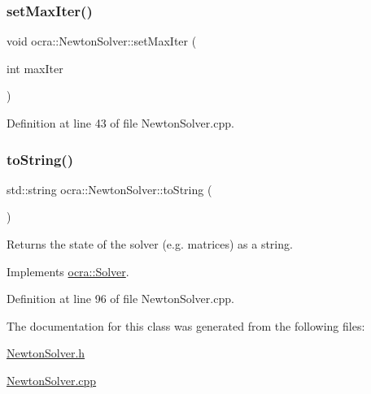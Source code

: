 \hypertarget{classocra_1_1NewtonSolver_a7bea41cafca30faf5dca35a7e3bd8a2e}{}\label{classocra_1_1NewtonSolver_a7bea41cafca30faf5dca35a7e3bd8a2e} 
\subsubsection{\texorpdfstring{set\+Max\+Iter()}{setMaxIter()}}
{\footnotesize\ttfamily void ocra\+::\+Newton\+Solver\+::set\+Max\+Iter (\begin{DoxyParamCaption}\item[{int}]{max\+Iter }\end{DoxyParamCaption})}



Definition at line 43 of file Newton\+Solver.\+cpp.

\hypertarget{classocra_1_1NewtonSolver_a3d498cc7771cf3cf733552a35fd77006}{}\label{classocra_1_1NewtonSolver_a3d498cc7771cf3cf733552a35fd77006} 
\subsubsection{\texorpdfstring{to\+String()}{toString()}}
{\footnotesize\ttfamily std\+::string ocra\+::\+Newton\+Solver\+::to\+String (\begin{DoxyParamCaption}{ }\end{DoxyParamCaption})\hspace{0.3cm}{\ttfamily [virtual]}}

Returns the state of the solver (e.\+g. matrices) as a string. 

Implements \hyperlink{classocra_1_1Solver_ab3783d1c208500bfb1daa3e1abf34146}{ocra\+::\+Solver}.



Definition at line 96 of file Newton\+Solver.\+cpp.



The documentation for this class was generated from the following files\+:\begin{DoxyCompactItemize}
\item 
\hyperlink{NewtonSolver_8h}{Newton\+Solver.\+h}\item 
\hyperlink{NewtonSolver_8cpp}{Newton\+Solver.\+cpp}\end{DoxyCompactItemize}
